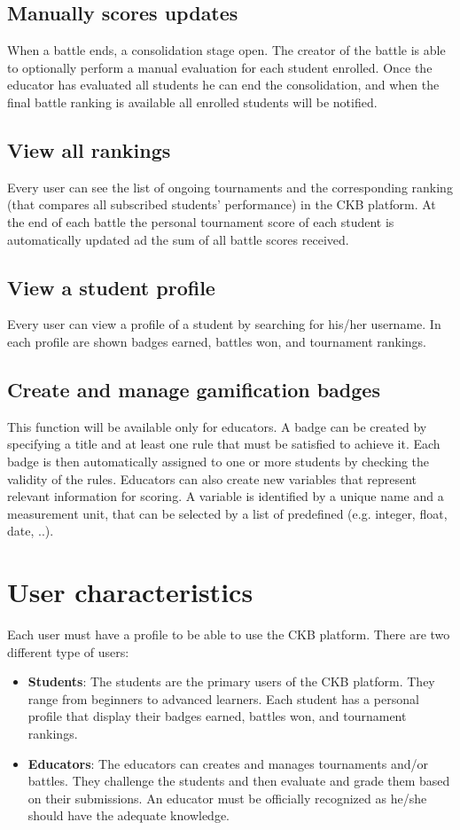 \subsection{Manually scores updates}
When a battle ends, a consolidation stage open. The creator of the battle is able to optionally perform a manual evaluation for each student enrolled.
Once the educator has evaluated all students he can end the consolidation, and when the final battle ranking is available all enrolled students will be notified.

\subsection{View all rankings}
Every user can see the list of ongoing tournaments and the corresponding ranking (that compares all subscribed students' performance) in the CKB platform.
At the end of each battle the personal tournament score of each student is automatically updated ad the sum of all battle scores received. 

\subsection{View a student profile}
Every user can view a profile of a student by searching for his/her username. In each profile are shown badges earned, battles won, and tournament rankings. 

\subsection{Create and manage gamification badges}
This function will be available only for educators. 
\newline A badge can be created by specifying a title and at least one rule that must be satisfied to achieve it. Each badge is then automatically assigned to one or more students by checking the validity of the rules. Educators can also create new variables that represent relevant information for scoring. A variable is identified by a unique name and a measurement unit, that can be selected by a list of predefined (e.g. integer, float, date, ..).

\clearpage

\section{User characteristics}
Each user must have a profile to be able to use the CKB platform.
There are two different type of users:
\begin{itemize}
	\item \textbf{Students}:
	    The students are the primary users of the CKB platform. They range from beginners to advanced learners. Each student has a personal profile that display their badges earned, battles won, and tournament rankings. 
	\item \textbf{Educators}: 
		The educators can creates and manages tournaments and/or battles. They challenge the students and then evaluate and grade them based on their submissions. An educator must be officially recognized as he/she should have the adequate knowledge.
\end{itemize}

